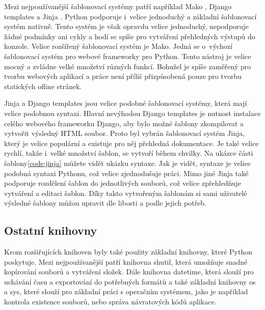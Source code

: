 \documentclass[thesis=B,czech]{resources/FITthesis}[2012/06/26]
\begin{document}
Mezi nejpoužívanější šablonovací systémy patří například Mako \cite{mako}, Django templates a Jinja \cite{jinja}. Python podporuje i~velice jednoduchý a základní šablonovací systém nativně. Tento systém je však opravdu velice jednoduchý, nepodporuje žádné podmínky ani cykly a hodí se spíše pro vytváření přehledných výstupů do konzole. Velice rozšířený šablonovací systém je Mako. Jedná se o~výchozí šablonovací systém pro webové frameworky pro Python. Tento nástroj je velice mocný a zvládne velké množství různých funkcí. Bohužel je spíše zaměřený pro tvorbu webových aplikací a práce není příliš přizpůsobená pouze pro tvorbu statických ofline stránek.\par

Jinja a Django templates jsou velice podobné šablonovací systémy, která mají velice podobnou syntaxi. Hlavní nevýhodou Django templates je nutnost instalace celého webového frameworku Django, aby bylo možné šablony zkompilovat a vytvořit výsledný HTML soubor. Proto byl vybrán šablonovací systém Jinja, který je velice populární a existuje pro něj přehledná dokumentace. Je také velice rychlí, takže i~velké množství šablon, se vytvoří během chvilky. Na ukázce části šablony\ref{code:jinja} můžete vidět ukázku syntaxe. Jak je vidět, syntaxe je velice podobná syntaxi Pythonu, což velice zjednodušuje práci. Mimo jiné Jinja také podporuje rozdělení šablon do jednotlivých souborů, což velice zpřehledňuje vytváření a editaci šablon. Díky takto vytvořeným šablonám si sami uživatelé výsledné šablony můžou upravit dle libosti a podle jejich potřeb. 

\subsection{Ostatní knihovny}
Krom rozšiřujících knihoven byly také použity základní knihovny, které Python poskytuje. Mezi nejpoužívanější patří knihovna shutil, která umožňuje snadné kopírování souborů a vytváření složek. Dále knihovna datetime, která slouží pro uchávání času a exportování do potřebných formátů a také základní knihovny os a sys, které slouží pro základní práci s operačním systémem, jako je například kontrola existence souborů, nebo správa návratových kódů aplikace.
\end{document}
